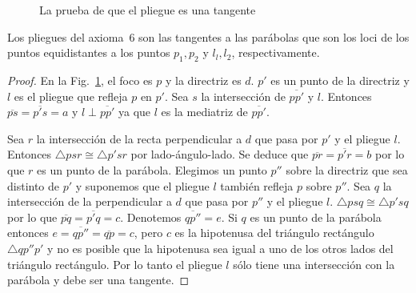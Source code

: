 \begin{figure}[thb]
\begin{center}
\end{center}
\caption{La prueba de que el pliegue es una tangente}\label{f.tangent-proof}
\end{figure}

\begin{theorem}\label{thm.parabola-tangents}
Los pliegues del axioma~$6$ son las tangentes a las parábolas que son los loci de los puntos equidistantes a los puntos $p_1,p_2$ y $l_l,l_2$, respectivamente.
\end{theorem}
\begin{proof}
En la Fig.~\ref{f.tangent-proof}, el foco es $p$ y la directriz es $d$. $p'$ es un punto de la directriz y $l$ es el pliegue que refleja $p$ en $p'$. Sea $s$ la intersección de $\overline{pp'}$ y $l$. Entonces $\overline{ps}=\overline{p's}=a$ y $l\perp \overline{pp'}$ ya que $l$ es la mediatriz de $\overline{pp'}$.

Sea $r$ la intersección de la recta perpendicular a $d$ que pasa por $p'$ y el pliegue $l$. Entonces $\triangle psr\cong \triangle p'sr$ por lado-ángulo-lado. Se deduce que 
$\overline{pr}=\overline{p'r}=b$ por lo que $r$ es un punto de la parábola. Elegimos un punto $p''$ sobre la directriz que sea distinto de $p'$ y suponemos que el pliegue $l$ también refleja $p$ sobre $p''$. Sea $q$ la intersección de la perpendicular a $d$ que pasa por $p''$ y el pliegue $l$. $\triangle psq\cong \triangle p'sq$ por lo que $\overline{pq}=\overline{p'q}=c$. Denotemos $\overline{qp''}=e$. Si $q$ es un punto de la parábola entonces $e=\overline{qp''}=\overline{qp}=c$, pero $c$ es la hipotenusa del triángulo rectángulo $\triangle qp''p'$ y no es posible que la hipotenusa sea igual a uno de los otros lados del triángulo rectángulo. Por lo tanto el pliegue $l$ sólo tiene una intersección con la parábola y debe ser una tangente.
\end{proof}

